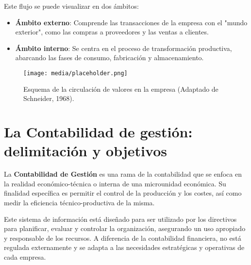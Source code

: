 Este flujo se puede visualizar en dos ámbitos:
\begin{itemize}
    \item \textbf{Ámbito externo}: Comprende las transacciones de la empresa con el "mundo exterior", como las compras a proveedores y las ventas a clientes.
    \item \textbf{Ámbito interno}: Se centra en el proceso de transformación productiva, abarcando las fases de consumo, fabricación y almacenamiento.
\end{itemize}

\begin{figure}[H]
    \centering
    \texttt{[image: media/placeholder.png]} %
    \caption{Esquema de la circulación de valores en la empresa (Adaptado de Schneider, 1968).}
\end{figure}

\section{La Contabilidad de gestión: delimitación y objetivos}

\begin{definicion}
La \textbf{Contabilidad de Gestión} es una rama de la contabilidad que se enfoca en la realidad económico-técnica o interna de una microunidad económica. Su finalidad específica es permitir el control de la producción y los costes, así como medir la eficiencia técnico-productiva de la misma.
\end{definicion}

Este sistema de información está diseñado para ser utilizado por los directivos para planificar, evaluar y controlar la organización, asegurando un uso apropiado y responsable de los recursos. A diferencia de la contabilidad financiera, no está regulada externamente y se adapta a las necesidades estratégicas y operativas de cada empresa.

